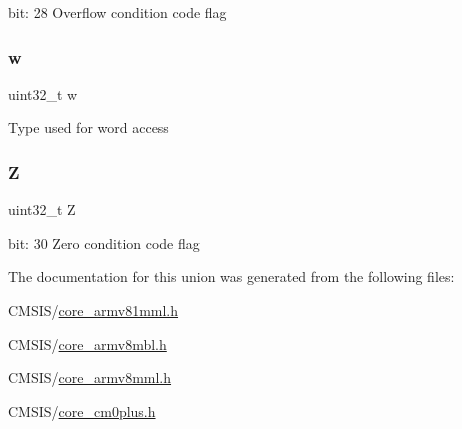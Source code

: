 bit\+: 28 Overflow condition code flag \mbox{\label{union_a_p_s_r___type_ad0fb62e7a08e70fc5e0a76b67809f84b}} 
\subsubsection{\texorpdfstring{w}{w}}
{\footnotesize\ttfamily uint32\+\_\+t w}

Type used for word access \mbox{\label{union_a_p_s_r___type_a5ae954cbd9986cd64625d7fa00943c8e}} 
\subsubsection{\texorpdfstring{Z}{Z}}
{\footnotesize\ttfamily uint32\+\_\+t Z}

bit\+: 30 Zero condition code flag 

The documentation for this union was generated from the following files\+:\begin{DoxyCompactItemize}
\item 
C\+M\+S\+I\+S/\mbox{\hyperlink{core__armv81mml_8h}{core\+\_\+armv81mml.\+h}}\item 
C\+M\+S\+I\+S/\mbox{\hyperlink{core__armv8mbl_8h}{core\+\_\+armv8mbl.\+h}}\item 
C\+M\+S\+I\+S/\mbox{\hyperlink{core__armv8mml_8h}{core\+\_\+armv8mml.\+h}}\item 
C\+M\+S\+I\+S/\mbox{\hyperlink{core__cm0plus_8h}{core\+\_\+cm0plus.\+h}}\end{DoxyCompactItemize}
